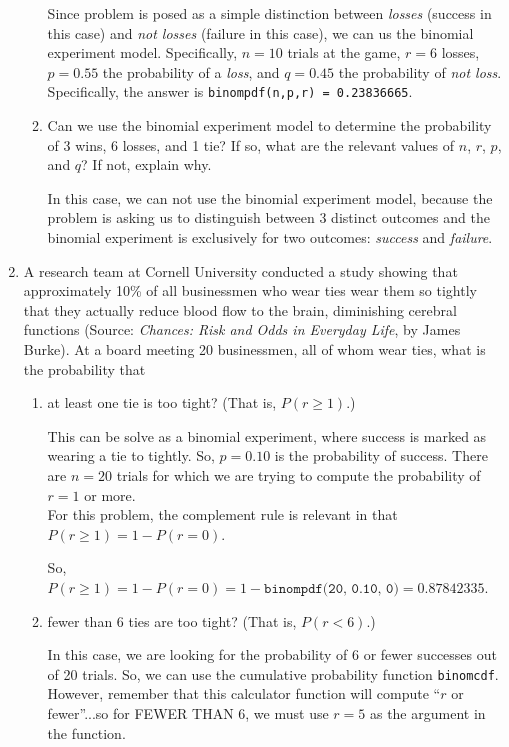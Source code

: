 \documentclass{article}
\newcommand{\answer}[1]{\color{red}#1}
\begin{document}
\begin{enumerate}
\begin{enumerate}
	{\answer Since problem is posed as a simple distinction between {\em losses} (success in this case) and {\em not losses} (failure in this case), we can us the binomial experiment model.  Specifically, $n = 10$ trials at the game, $r=6$ losses, $p=0.55$ the probability of a {\em loss}, and $q=0.45$ the probability of {\em not loss}.   Specifically, the answer is \texttt{binompdf(n,p,r) = 0.23836665}.
	} 

	\item Can we use the binomial experiment model to determine the probability of 3 wins, 6 losses, and 1 tie?  If so, what are the relevant values of $n$, $r$, $p$, and $q$?  If not, explain why. 
	
	{\answer In this case, we can not use the binomial experiment model, because the problem is asking us to distinguish between 3 distinct outcomes and the binomial experiment is exclusively for two outcomes: {\em success} and {\em failure}.
	} 

	\end{enumerate}

\item	A research team at Cornell University conducted a study showing that approximately 10\% of all businessmen who wear ties wear them so tightly that they actually reduce blood flow to the brain, diminishing cerebral functions (Source: {\em Chances: Risk and Odds in Everyday Life}, by James Burke).  At a board meeting 20 businessmen, all of whom wear ties, what is the probability that

	\begin{enumerate}
	\item at least one tie is too tight?  (That is, $P(r\geq 1)$.) 
	
	{\answer This can be solve as a binomial experiment, where success is marked as wearing a tie to tightly.  So, $p=0.10$ is the probability of success.  There are $n=20$ trials for which we are trying to compute the probability of $r = 1$ or more.\\
	For this problem, the complement rule is relevant in that $P(r\geq 1) = 1-P(r=0)$.
	
	So, $P(r\geq 1) = 1-P(r=0)=1-\texttt{binompdf(20, 0.10, 0)} = 0.87842335$.
	} 
	
	\item fewer than 6 ties are too tight? (That is, $P(r< 6)$.) 
	
	{\answer In this case, we are looking for the probability of 6 or fewer successes out of 20 trials.  So, we can use the cumulative probability function \texttt{binomcdf}.  However, remember that this calculator function will compute ``$r$ or fewer''...so for FEWER THAN 6, we must use $r=5$ as the argument in the function.  
	
}
\end{enumerate}
\end{enumerate}
\end{document}
